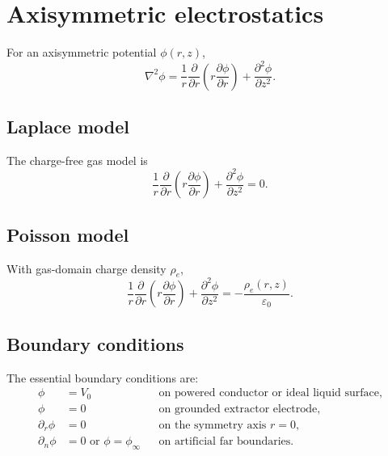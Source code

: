 \documentclass[11pt]{article}
\newcommand{\eps}{\varepsilon}
\begin{document}
\section{Axisymmetric electrostatics}

For an axisymmetric potential \(\phi(r,z)\),
\begin{equation}
    \nabla^2\phi
    =
    \frac{1}{r}\frac{\partial}{\partial r}
    \left(r\frac{\partial\phi}{\partial r}\right)
    +
    \frac{\partial^2\phi}{\partial z^2}.
    \label{eq:axi_operator}
\end{equation}

\subsection{Laplace model}

The charge-free gas model is
\begin{equation}
    \frac{1}{r}\frac{\partial}{\partial r}
    \left(r\frac{\partial\phi}{\partial r}\right)
    +\frac{\partial^2\phi}{\partial z^2}=0.
    \label{eq:laplace_axi}
\end{equation}

\subsection{Poisson model}

With gas-domain charge density \(\rho_e\),
\begin{equation}
    \frac{1}{r}\frac{\partial}{\partial r}
    \left(r\frac{\partial\phi}{\partial r}\right)
    +\frac{\partial^2\phi}{\partial z^2}
    =-\frac{\rho_e(r,z)}{\eps_0}.
    \label{eq:poisson_axi}
\end{equation}

\subsection{Boundary conditions}

The essential boundary conditions are:
\begin{align}
    \phi&=V_0 &&\text{on powered conductor or ideal liquid surface},\\
    \phi&=0 &&\text{on grounded extractor electrode},\\
    \partial_r\phi&=0 &&\text{on the symmetry axis } r=0,\\
    \partial_n\phi&=0\text{ or }\phi=\phi_\infty &&\text{on artificial far boundaries}.
\end{align}
\end{document}
